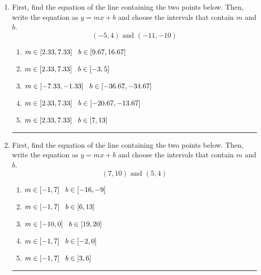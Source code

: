 \documentclass[14pt]{extbook}
\newcommand{\litem}[1]{\item#1\hspace*{-1cm}\rule{\textwidth}{0.4pt}}
\begin{document}
\begin{enumerate}
{\begin{enumerate}[label=\Alph*.]
\end{enumerate} }
\litem{
First, find the equation of the line containing the two points below. Then, write the equation as $ y=mx+b $ and choose the intervals that contain $m$ and $b$.\[ (-5, 4) \text{ and } (-11, -10) \]\begin{enumerate}[label=\Alph*.]
\item \( m \in [2.33, 7.33] \hspace*{3mm} b \in [9.67, 16.67] \)
\item \( m \in [2.33, 7.33] \hspace*{3mm} b \in [-3, 5] \)
\item \( m \in [-7.33, -1.33] \hspace*{3mm} b \in [-36.67, -34.67] \)
\item \( m \in [2.33, 7.33] \hspace*{3mm} b \in [-20.67, -13.67] \)
\item \( m \in [2.33, 7.33] \hspace*{3mm} b \in [7, 13] \)

\end{enumerate} }
\litem{
First, find the equation of the line containing the two points below. Then, write the equation as $ y=mx+b $ and choose the intervals that contain $m$ and $b$.\[ (7, 10) \text{ and } (5, 4) \]\begin{enumerate}[label=\Alph*.]
\item \( m \in [-1, 7] \hspace*{3mm} b \in [-16, -9] \)
\item \( m \in [-1, 7] \hspace*{3mm} b \in [6, 13] \)
\item \( m \in [-10, 0] \hspace*{3mm} b \in [19, 20] \)
\item \( m \in [-1, 7] \hspace*{3mm} b \in [-2, 0] \)
\item \( m \in [-1, 7] \hspace*{3mm} b \in [3, 6] \)


\end{enumerate}}
\end{enumerate}
\end{document}
